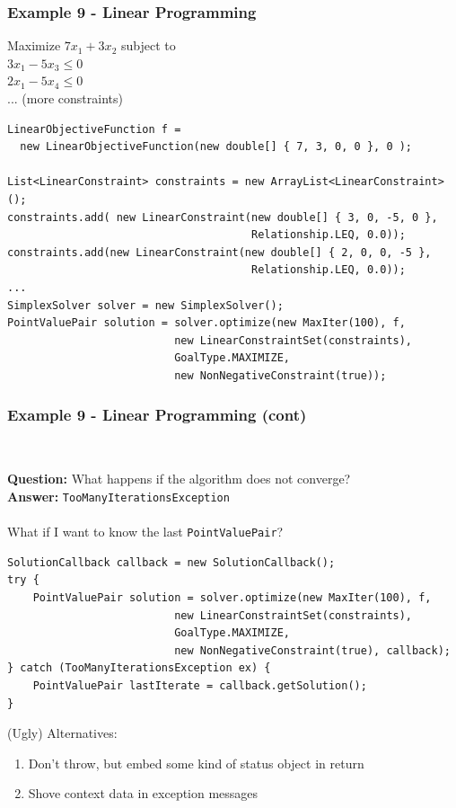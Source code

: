 \documentclass[14pt,mathserif]{beamer}
\begin{document}
\begin{frame}[fragile]
  \frametitle{Example 9 - Linear Programming} 

\begin{small}
Maximize \(7x_1 + 3x_2\) subject to \\
\(3x_1 - 5x_3 \leq 0\) \\
\(2x_1 -5x_4 \leq 0\) \\
... (more constraints) \\

\begin{verbatim}
LinearObjectiveFunction f = 
  new LinearObjectiveFunction(new double[] { 7, 3, 0, 0 }, 0 );

List<LinearConstraint> constraints = new ArrayList<LinearConstraint>();
constraints.add( new LinearConstraint(new double[] { 3, 0, -5, 0 },
                                      Relationship.LEQ, 0.0));  
constraints.add(new LinearConstraint(new double[] { 2, 0, 0, -5 },
                                      Relationship.LEQ, 0.0));
...
SimplexSolver solver = new SimplexSolver();
PointValuePair solution = solver.optimize(new MaxIter(100), f,
                          new LinearConstraintSet(constraints),
                          GoalType.MAXIMIZE,
                          new NonNegativeConstraint(true));
\end{verbatim}
\end{small}
\end{frame}

\begin{frame}[fragile]
  \frametitle{Example 9 - Linear Programming (cont)} 
\\ 
\begin{small}
\textbf{Question:} What happens if the algorithm does not converge? \\
\textbf{Answer:} \texttt{TooManyIterationsException} \\~\\
What if I want to know the last \texttt{PointValuePair}?

\begin{verbatim}
SolutionCallback callback = new SolutionCallback();
try {
    PointValuePair solution = solver.optimize(new MaxIter(100), f,
                          new LinearConstraintSet(constraints),
                          GoalType.MAXIMIZE,
                          new NonNegativeConstraint(true), callback);
} catch (TooManyIterationsException ex) {
	PointValuePair lastIterate = callback.getSolution();
}
\end{verbatim}

(Ugly) Alternatives:
\begin{enumerate}
\item Don't throw, but embed some kind of status object in return
\item Shove context data in exception messages
\end{enumerate}
\end{small}
\end{frame}
 
\end{document}
